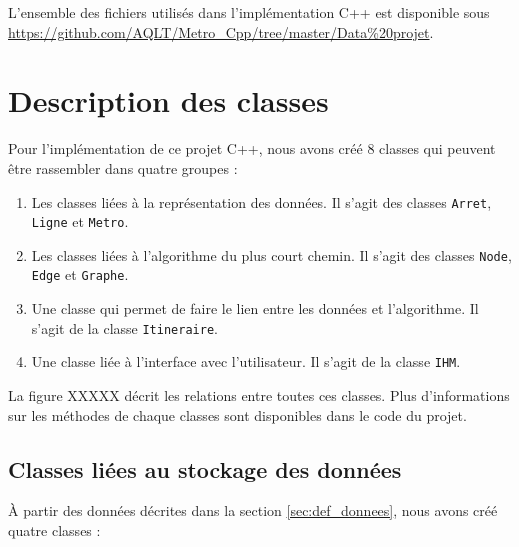 \documentclass[,french]{article}
\begin{document}
L'ensemble des fichiers utilisés dans l'implémentation C++ est
disponible sous
\url{https://github.com/AQLT/Metro_Cpp/tree/master/Data\%20projet}.

\hypertarget{sec:desc_classes}{%
\section{Description des classes}\label{sec:desc_classes}}

Pour l'implémentation de ce projet C++, nous avons créé 8 classes qui
peuvent être rassembler dans quatre groupes :

\begin{enumerate}
\def\labelenumi{\arabic{enumi}.}
\item
  Les classes liées à la représentation des données. Il s'agit des
  classes \texttt{Arret}, \texttt{Ligne} et \texttt{Metro}.
\item
  Les classes liées à l'algorithme du plus court chemin. Il s'agit des
  classes \texttt{Node}, \texttt{Edge} et \texttt{Graphe}.
\item
  Une classe qui permet de faire le lien entre les données et
  l'algorithme. Il s'agit de la classe \texttt{Itineraire}.
\item
  Une classe liée à l'interface avec l'utilisateur. Il s'agit de la
  classe \texttt{IHM}.
\end{enumerate}

La figure XXXXX décrit les relations entre toutes ces classes. Plus
d'informations sur les méthodes de chaque classes sont disponibles dans
le code du projet.

\hypertarget{classes-liuxe9es-au-stockage-des-donnuxe9es}{%
\subsection{Classes liées au stockage des
données}\label{classes-liuxe9es-au-stockage-des-donnuxe9es}}

À partir des données décrites dans la section \ref{sec:def_donnees},
nous avons créé quatre classes :
\end{document}
